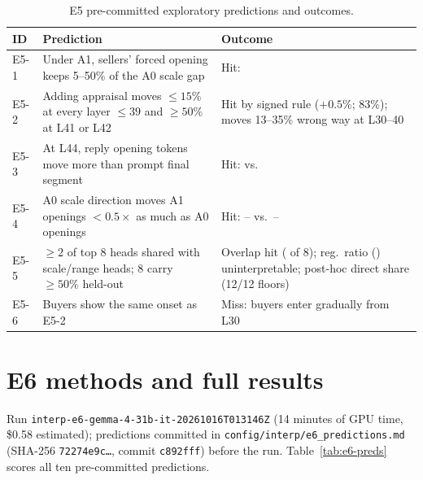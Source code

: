 \begin{table}[t]
  \centering
  \caption{E5 pre-committed exploratory predictions and outcomes.}
  \label{tab:e5-preds}
  \small
  \begin{tabular}{@{}lp{}p{}@{}}
    \toprule
    ID & Prediction & Outcome \\
    \midrule
    E5-1 & Under A1, sellers' forced opening keeps 5--50\% of the A0 scale gap & Hit: \eFiveGapShare{} \\
    E5-2 & Adding appraisal moves $\le 15\%$ at every layer $\le 39$ and $\ge 50\%$ at L41 or L42 & Hit by signed rule ($+0.5\%$; 83\%); moves 13--35\% wrong way at L30--40 \\
    E5-3 & At L44, reply opening tokens move more than prompt final segment & Hit: \eFiveReplyShare{} vs.\ \eFivePromptShare{} \\
    E5-4 & A0 scale direction moves A1 openings $< 0.5\times$ as much as A0 openings & Hit: \eFiveSteerAoneLow{}--\eFiveSteerAoneHigh{} vs.\ \eFiveSteerAzeroLow{}--\eFiveSteerAzeroHigh{} \\
    E5-5 & $\ge 2$ of top 8 heads shared with scale/range heads; 8 carry $\ge 50\%$ held-out & Overlap hit (\eFiveHeadOverlap{} of 8); reg.\ ratio (\eFiveHeldOutRatio{}) uninterpretable; post-hoc direct share \eFiveHeldOutOwnGapPct{} (12/12 floors) \\
    E5-6 & Buyers show the same onset as E5-2 & Miss: buyers enter gradually from L30 \\
    \bottomrule
  \end{tabular}
\end{table}





\FloatBarrier

\section{E6 methods and full results}
\label{app:e6}

Run \texttt{interp-e6-gemma-4-31b-it-20261016T013146Z} (14 minutes of GPU time, \$0.58 estimated); predictions committed in \texttt{config/interp/e6\_predictions.md} (SHA-256 \texttt{72274e9c\ldots}, commit \texttt{c892fff}) before the run. Table~\ref{tab:e6-preds} scores all ten pre-committed predictions.

